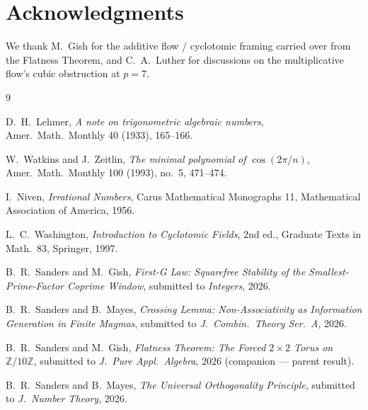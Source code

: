 \documentclass[11pt,reqno]{amsart}
\theoremstyle{plain}
\theoremstyle{definition}
\newcommand{\Z}{\mathbb{Z}}
\begin{document}
\section*{Acknowledgments}

We thank M.~Gish for the additive flow / cyclotomic framing carried over from the Flatness Theorem, and C.~A.~Luther for discussions on the multiplicative flow's cubic obstruction at $p = 7$.

\begin{thebibliography}{9}

D.~H.~Lehmer,
\emph{A note on trigonometric algebraic numbers},
Amer.\ Math.\ Monthly 40 (1933), 165--166.

W.~Watkins and J.~Zeitlin,
\emph{The minimal polynomial of $\cos(2 \pi / n)$},
Amer.\ Math.\ Monthly 100 (1993), no.\ 5, 471--474.

I.~Niven,
\emph{Irrational Numbers},
Carus Mathematical Monographs 11, Mathematical Association of America, 1956.

L.~C.~Washington,
\emph{Introduction to Cyclotomic Fields}, 2nd ed.,
Graduate Texts in Math.\ 83, Springer, 1997.

B.~R.~Sanders and M.~Gish,
\emph{First-G Law: Squarefree Stability of the Smallest-Prime-Factor Coprime Window},
submitted to \emph{Integers}, 2026.

B.~R.~Sanders and B.~Mayes,
\emph{Crossing Lemma: Non-Associativity as Information Generation in Finite Magmas},
submitted to \emph{J.\ Combin.\ Theory Ser.\ A}, 2026.

B.~R.~Sanders and M.~Gish,
\emph{Flatness Theorem: The Forced $2 \times 2$ Torus on $\Z/10\Z$},
submitted to \emph{J.\ Pure Appl.\ Algebra}, 2026 (companion --- parent result).

B.~R.~Sanders and B.~Mayes,
\emph{The Universal Orthogonality Principle},
submitted to \emph{J.\ Number Theory}, 2026.

\end{thebibliography}
\end{document}
